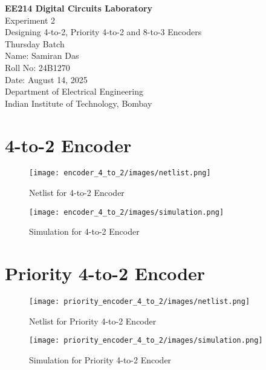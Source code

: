 \documentclass[a4paper,12pt]{report}
\begin{document}
\begin{titlepage}
    \centering
    {\Huge\bfseries EE214 Digital Circuits Laboratory\\[1.5em]}
    {\Large Experiment 2\\
     Designing 4-to-2, Priority 4-to-2 and 8-to-3 Encoders\\
     Thursday Batch\\[2em]}
    \vfill
    {\large Name: Samiran Das\\
    Roll No: 24B1270\\
    Date: August 14, 2025\\[4em]}
    \vfill
    {\large Department of Electrical Engineering\\[1em]}
    {\large Indian Institute of Technology, Bombay\\[2em]}
\end{titlepage}




\section*{4-to-2 Encoder}
\begin{figure}[ht!]
    \centering
    \texttt{[image: encoder\_4\_to\_2/images/netlist.png]}
    \caption{Netlist for 4-to-2 Encoder}
\end{figure}
\begin{figure}[ht!]
    \centering
    \texttt{[image: encoder\_4\_to\_2/images/simulation.png]}
    \caption{Simulation for 4-to-2 Encoder}
\end{figure}
\clearpage
\clearpage

\section*{Priority 4-to-2 Encoder}
\begin{figure}[ht!]
    \centering
    \texttt{[image: priority\_encoder\_4\_to\_2/images/netlist.png]}
    \caption{Netlist for Priority 4-to-2 Encoder}
\end{figure}
\begin{figure}[ht!]
    \centering
    \texttt{[image: priority\_encoder\_4\_to\_2/images/simulation.png]}
    \caption{Simulation for Priority 4-to-2 Encoder}
\end{figure}
\clearpage
\clearpage
\end{document}
